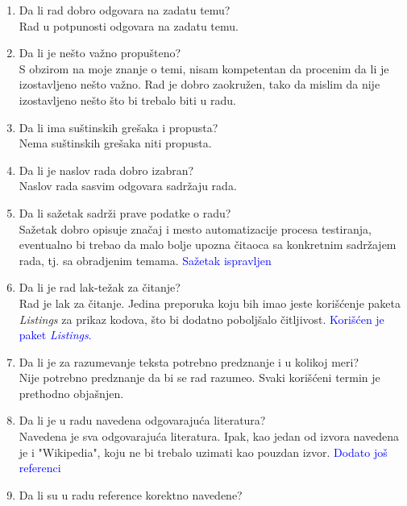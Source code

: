 \documentclass[a4paper]{report}
\newcommand{\odgovor}[1]{\textcolor{blue}{#1}}
\begin{document}
\begin{enumerate}
\item Da li rad dobro odgovara na zadatu temu?\\

	Rad u potpunosti odgovara na zadatu temu.
\item Da li je nešto važno propušteno?\\

	S obzirom na moje znanje o temi, nisam kompetentan da procenim da li je izostavljeno nešto važno. Rad je dobro zaokružen, tako da mislim da nije izostavljeno nešto što bi trebalo biti u radu.
\item Da li ima suštinskih grešaka i propusta?\\

	Nema suštinskih grešaka niti propusta.
\item Da li je naslov rada dobro izabran?\\

	Naslov rada sasvim odgovara sadržaju rada.
\item Da li sažetak sadrži prave podatke o radu?\\

	Sažetak dobro opisuje značaj i mesto automatizacije procesa testiranja, eventualno bi trebao da malo bolje upozna čitaoca sa konkretnim sadržajem rada, tj. sa obradjenim temama.
\odgovor{Sažetak ispravljen}
\item Da li je rad lak-težak za čitanje?\\

	Rad je lak za čitanje. Jedina preporuka koju bih imao jeste korišćenje paketa \textit{Listings} za prikaz kodova, što bi dodatno poboljšalo čitljivost.
\odgovor{Korišćen je paket \textit{Listings}.}
\item Da li je za razumevanje teksta potrebno predznanje i u kolikoj meri?\\

	Nije potrebno predznanje da bi se rad razumeo. Svaki korišćeni termin je prethodno objašnjen.
\item Da li je u radu navedena odgovarajuća literatura?\\

	Navedena je sva odgovarajuća literatura. Ipak, kao jedan od izvora navedena je i "Wikipedia", koju ne bi trebalo uzimati kao pouzdan izvor.
\odgovor{Dodato još referenci}
\item Da li su u radu reference korektno navedene?\\


\end{enumerate}
\end{document}
